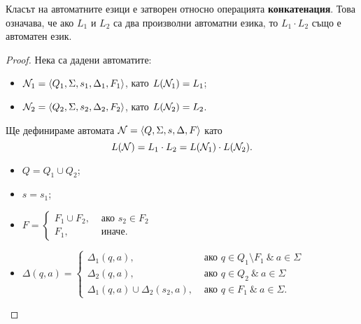 \begin{lemma}
  Класът на автоматните езици е затворен относно операцията {\bf конкатенация}.
  Това означава, че ако $L_1$ и $L_2$ са два произволни автоматни езика, то $L_1\cdot L_2$
  също е автоматен език.
\end{lemma}
\begin{proof}
  Нека са дадени автоматите:
  \begin{itemize}
  \item
    $\mathcal{N}_1 = \langle{Q_1,\Sigma,s_1,\Delta_1,F_1}\rangle$, като $L(\mathcal{N}_1) = L_1$;
  \item
    $\mathcal{N}_2 = \langle{Q_2,\Sigma,s_2,\Delta_2,F_2}\rangle$, като $L(\mathcal{N}_2) = L_2$.
  \end{itemize}
  Ще дефинираме автомата $\mathcal{N} = \langle{Q,\Sigma,s,\Delta,F}\rangle$ като
  \[L(\mathcal{N}) = L_1\cdot L_2 = L(\mathcal{N}_1)\cdot L(\mathcal{N}_2).\]
  \begin{itemize}
  \item
    $Q = Q_1 \cup Q_2$;
  \item
    $s = s_1$;
  \item
    $F = 
    \begin{cases}
      F_1 \cup F_2, & \text{ ако } s_2 \in F_2\\
      F_1,          & \text{ иначе}.
    \end{cases}$
  \item 
    $\Delta(q,a) = 
    \begin{cases}
      \Delta_1(q,a),                      & \text{ ако }q\in Q_1\setminus F_1\ \&\ a\in\Sigma\\
      \Delta_2(q,a),                      & \text{ ако }q\in Q_2\ \&\ a\in\Sigma\\
      \Delta_1(q,a) \cup \Delta_2(s_2,a), & \text{ ако }q \in F_1\ \&\ a\in\Sigma.
    \end{cases}$
  \end{itemize}
\end{proof}

